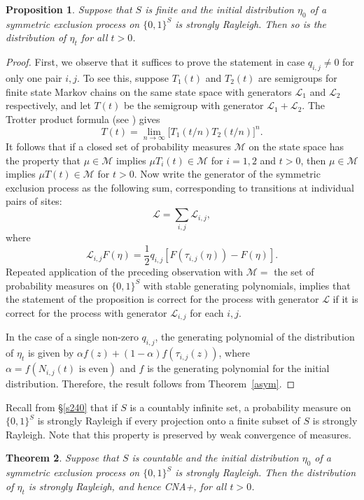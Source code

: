 \documentclass[10pt,reqno]{amsart}
\theoremstyle{plain}
\newtheorem{theorem}{Theorem}[section]
\newtheorem{proposition}[theorem]{Proposition}
\theoremstyle{definition}
\theoremstyle{remark}
\begin{document}
\begin{proposition}\label{prop-lig}
Suppose that $S$ is finite and the initial distribution
$\eta_0$ 
of a symmetric exclusion process on $\{0,1\}^S$ is strongly Rayleigh.
Then so is the distribution of $\eta_t$ for all $t> 0$.
\end{proposition}

\begin{proof}  
First, we observe that it suffices to prove the statement in case
$q_{i,j}\neq 0$ for only one
pair $i,j$.  To see this, suppose $T_1(t)$ and $T_2(t)$ are semigroups for 
finite state Markov chains
on the same state space with generators $\mathcal{L}_1$ and $\mathcal{L}_2$ 
respectively, and let $T(t)$ be the semigroup
with generator $\mathcal{L}_1+\mathcal{L}_2$. The Trotter product formula 
(see \cite[p.~33]{EK}) gives
$$T(t)=\lim_{n\rightarrow\infty}\big[T_1(t/n)T_2(t/n)\big]^n.$$
It follows that if a closed set of probability measures $\mathcal{M}$ on 
the state space has the property 
that $\mu\in \mathcal{M}$ implies $\mu T_i(t)\in \mathcal{M}$ for $i=1,2$ 
and $t>0$, then 
$\mu\in\mathcal{M}$ implies $\mu T(t)\in \mathcal{M}$ for $t>0$.
Now write the generator of the symmetric exclusion process as the following 
sum, corresponding to transitions at individual pairs of sites:
$$\mathcal{L}=\sum_{i,j}\mathcal{L}_{i,j},$$
where
$$\mathcal{L}_{i,j}F(\eta)=\frac 12q_{i,j}[F(\tau_{i,j}(\eta))-F(\eta)].$$
Repeated application of the preceding observation with $\mathcal{M}=$ the 
set of probability measures on
$\{0,1\}^S$ with stable generating polynomials, implies that the statement of 
the proposition
is correct for the process with generator $\mathcal{L}$ if it is correct for 
the process with generator $\mathcal{L}_{i,j}$ for each $i,j$. 

In the case of a single non-zero $q_{i,j}$, the generating
polynomial of the distribution of $\eta_t$ is given by $\alpha
f(z)+(1-\alpha)f(\tau_{i,j}(z))$, where
$\alpha=f(N_{i,j}(t)\text{ is even})$ and $f$ is the generating polynomial
for the initial distribution. Therefore, the result follows from 
Theorem~\ref{asym}.
\end{proof}

Recall from \S \ref{s240} that if $S$ is a 
countably infinite set, a probability measure on
$\{0,1\}^S$ is strongly
Rayleigh if every projection onto a finite subset of $S$ is strongly Rayleigh. 
Note that this property is preserved by weak convergence of measures. 

\begin{theorem}\label{th-Lig}
Suppose that $S$ is countable and the initial distribution $\eta_0$ of a 
symmetric exclusion process 
on $\{0,1\}^S$ is strongly Rayleigh. Then the distribution of $\eta_t$ is 
strongly Rayleigh, and hence CNA+, for all $t>0$.
\end{theorem}
\end{document}
